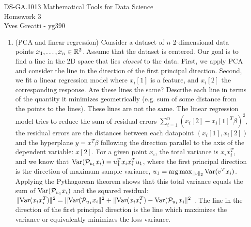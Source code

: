 \documentclass[12pt,twoside]{article}
\begin{document}
\noindent DS-GA.1013 Mathematical Tools for Data Science \\
Homework 3 \\
Yves Greatti - yg390\\

\begin{enumerate}
\item (PCA and linear regression) Consider a dataset of $n$ 2-dimensional data points $x_1,\ldots,x_n \in \mathbb{R}^2$. Assume that the dataset is centered. Our goal is to find a line in the 2D space that lies \emph{closest} to the data. First, we apply PCA and consider the line in the direction of the first principal direction. Second, we fit a linear regression model where $x_i[1]$ is a feature, and $x_i[2]$ the corresponding response. Are these lines the same? Describe each line in terms of the quantity it minimizes geometrically (e.g. sum of some distance from the points to the lines).
	These lines are not the same. The linear regression model tries to reduce the sum of residual errors $\sum_{i=1}^n(x_i[2] - x_i[1]^T \beta)^2$, the residual errors are the distances between each datapoint $(x_i[1], x_i[2])$ and the hyperplane $y=x^T \beta$ following the direction parallel to the axis of the dependent variable: $x[2]$.
	For a given point $x_i$, the total variance is $x_i x_i^T$, and we know that $\var(\mathcal{P}_{u_1} x_i) =  u_1^T x_i x_i^T u_1$, where the first principal direction is the direction of maximum sample variance, $u_1 = \arg \max_{\|v\|_2} \var(v^T x_i)$.
	Applying the Pythagorean theorem shows that this total variance equals the sum of $\var(\mathcal{P}_{u_1} x_i)$ and the squared residual: 
	$\|\var(x_i x_i^T)\|^2 = \| \var(\mathcal{P}_{u_1} x_i\|^2 + \|\var(x_i x_i^T) -  \var(\mathcal{P}_{u_1} x_i \|^2	$ .
	The line in the direction of the first principal direction is the line which maximizes the variance or equivalently minimizes the loss variance.
	


\end{enumerate}
\end{document}
